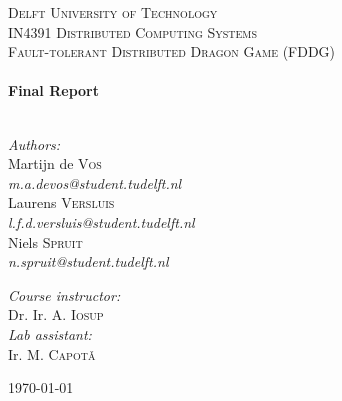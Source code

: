 \begin{titlepage}

\begin{center}


\textsc{\Large Delft University of Technology }\\[1.5cm]

\textsc{\large IN4391 Distributed Computing Systems}\\[0.5cm]
\textsc{\normalsize Fault-tolerant Distributed Dragon Game (FDDG)}\\[0.5cm]


\HRule \\[0.4cm]
{ \huge \bfseries Final Report}\\[0.4cm]

\HRule \\[1.5cm]

\begin{minipage}{0.4\textwidth}
\begin{flushleft} \large
\emph{Authors:}\\
Martijn de \textsc{Vos} \\ [0.1cm]
\emph{m.a.devos@student.tudelft.nl} \\ [0.1cm]
Laurens \textsc{Versluis} \\ [0.1cm]
\emph{l.f.d.versluis@student.tudelft.nl} \\ [0.1cm]
Niels \textsc{Spruit} \\ [0.1cm]
\emph{n.spruit@student.tudelft.nl} \\ [0.1cm]
\end{flushleft}
\end{minipage}
\begin{minipage}{0.4\textwidth}
\begin{flushright} \large
\emph{Course instructor:} \\
Dr. Ir. A. \textsc{Iosup}\\
\emph{Lab assistant:} \\
Ir. M. \textsc{Capot\v{a}} 
\end{flushright}
\end{minipage}
\vspace{30mm}

\vfill

{\large \today}

\end{center}

\end{titlepage}